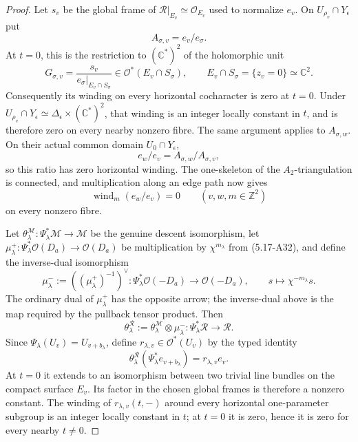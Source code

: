 \begin{proof}
Let \(s_v\) be the global frame of
\(\mathcal R|_{E_v}\simeq\mathcal O_{E_v}\) used to normalize \(e_v\).
On \(U_{\rho_v}\cap Y_\epsilon\) put
\[
 A_{\sigma,v}=e_v/e_\sigma.
\]
At \(t=0\), this is the restriction to \((\mathbb C^*)^2\) of the
holomorphic unit
\[
 G_{\sigma,v}
 =\frac{s_v}{e_\sigma|_{E_v\cap S_\sigma}}
 \in\mathcal O^*(E_v\cap S_\sigma),
 \qquad E_v\cap S_\sigma=\{z_v=0\}\simeq\mathbb C^2.
\]
Consequently its winding on every horizontal cocharacter is zero at
\(t=0\).  Under
\(U_{\rho_v}\cap Y_\epsilon\simeq
\Delta_\epsilon\times(\mathbb C^*)^2\), that winding is an integer locally
constant in \(t\), and is therefore zero on every nearby nonzero fibre.
The same argument applies to \(A_{\sigma,w}\).  On their actual common
domain \(U_0\cap Y_\epsilon\),
\[
 e_w/e_v=A_{\sigma,w}/A_{\sigma,v},
\]
so this ratio has zero horizontal winding.  The one-skeleton of the
\(A_2\)-triangulation is connected, and multiplication along an edge path
now gives
\[
 \operatorname{wind}_m(e_w/e_v)=0
 \qquad(v,w,m\in\mathbb Z^2)
\tag{5.17-A34b}
\]
on every nonzero fibre.

Let
\(\theta^{\mathcal M}_\lambda:\Psi_\lambda^*\mathcal M\to\mathcal M\)
be the genuine descent isomorphism, let
\(\mu^+_\lambda:\Psi_\lambda^*\mathcal O(D_a)\to\mathcal O(D_a)\)
be multiplication by \(\chi^{m_\lambda}\) from (5.17-A32), and define the
inverse-dual isomorphism
\[
 \mu^-_\lambda:=((\mu^+_\lambda)^{-1})^\vee:
 \Psi_\lambda^*\mathcal O(-D_a)\longrightarrow\mathcal O(-D_a),
 \qquad s\longmapsto\chi^{-m_\lambda}s.
\]
The ordinary dual of \(\mu^+_\lambda\) has the opposite arrow; the
inverse-dual above is the map required by the pullback tensor product.  Then
\[
 \theta^{\mathcal R}_\lambda
 :=\theta^{\mathcal M}_\lambda\otimes\mu^-_\lambda:
 \Psi_\lambda^*\mathcal R\longrightarrow\mathcal R.
\]
Since \(\Psi_\lambda(U_v)=U_{v+b_\lambda}\), define
\(r_{\lambda,v}\in\mathcal O^*(U_v)\) by the typed identity
\begin{equation}
 \theta^{\mathcal R}_\lambda
   (\Psi_\lambda^*e_{v+b_\lambda})
 =r_{\lambda,v}e_v.
\label{eq:analytic-residual-descent-factor}
\end{equation}
At \(t=0\) it extends to an isomorphism between two trivial line bundles
on the compact surface \(E_v\).  Its factor in the chosen global frames is
therefore a nonzero constant.  The winding of
\(r_{\lambda,v}(t,-)\) around every horizontal one-parameter subgroup is
an integer locally constant in \(t\); at \(t=0\) it is zero, hence it is
zero for every nearby \(t\ne0\).


\end{proof}
